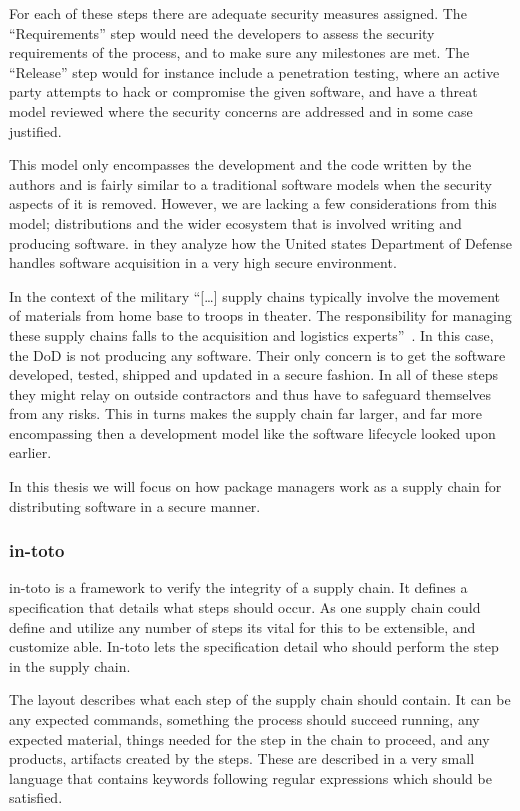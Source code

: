 \documentclass[../Main/thesis.tex]{subfiles}
\begin{document}
For each of these steps there are adequate security measures assigned. The
``Requirements'' step would need the developers to assess the security
requirements of the process, and to make sure any milestones are met. The
``Release'' step would for instance include a penetration testing, where an
active party attempts to hack or compromise the given software, and have a
threat model reviewed where the security concerns are addressed and in some case
justified.

This model only encompasses the development and the code written by the authors
and is fairly similar to a traditional software models when the security aspects
of it is removed. However, we are lacking a few considerations from this model;
distributions and the wider ecosystem that is involved writing and producing
software. \citeauthor{rj-ellison-2010} in  they
analyze how the United states Department of Defense handles software acquisition
in a very high secure environment. 


In the context of the military ``[\dots] supply chains typically
involve the movement of materials from home base to troops in theater. The
responsibility for managing these supply chains falls to the acquisition and
logistics experts''~\cite{rj-ellison-2010}. In this case, the DoD is not
producing any software. Their only concern is to get the software developed,
tested, shipped and updated in a secure fashion. In all of these steps they
might relay on outside contractors and thus have to safeguard themselves from
any risks. This in turns makes the supply chain far larger, and far more
encompassing then a development model like the software lifecycle looked upon
earlier.

In this thesis we will focus on how package managers work as a supply chain for
distributing software in a secure manner.


\subsubsection*{in-toto}
in-toto is a framework to verify the integrity of a supply chain. It defines a
specification that details what steps should occur. As one supply chain could
define and utilize any number of steps its vital for this to be extensible, and
customize able. In-toto lets the specification detail who should perform the
step in the supply chain.

The layout describes what each step of the supply chain should contain. It can
be any expected commands, something the process should succeed running, any
expected material, things needed for the step in the chain to proceed, and any
products, artifacts created by the steps. These are described in a very small
language that contains keywords following regular expressions which should be
satisfied.
\end{document}

